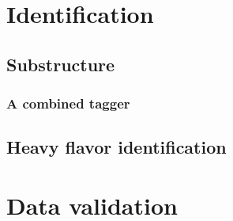 \section{Identification}

\subsection{Substructure}

\subsubsection{A combined tagger}
\label{sec:jets:combined}

\subsection{Heavy flavor identification}

\section{Data validation}
